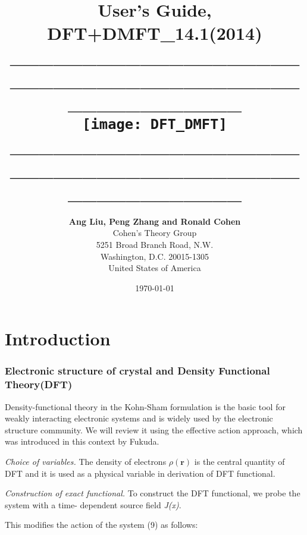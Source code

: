 \documentclass[12 pt]{article}
\title{
      {\Huge\textbf{User's Guide, DFT+DMFT\_14.1(2014)}}
      \_\_\_\_\_\_\_\_\_\_\_\_\_\_\_\_\_\_\_\_\_\_\_\_\_\_\_\_\_\_\_\_\_\_\_\_\_\_\_\_\_\_\_\_\_\_\_\_\_\_\_\_\\
      {\texttt{[image: DFT\_DMFT]}}
      \_\_\_\_\_\_\_\_\_\_\_\_\_\_\_\_\_\_\_\_\_\_\_\_\_\_\_\_\_\_\_\_\_\_\_\_\_\_\_\_\_\_\_\_\_\_\_\_\_\_\_\_\\
      } %
\author{
      \large\textbf{Ang Liu, Peng Zhang and Ronald Cohen}\\
      Cohen's Theory Group\\
      5251 Broad Branch Road, N.W.\\
      Washington, D.C. 20015-1305\\
      United States of America\\
	} %
\date{\today} %
\begin{document}
  \linespread{1.2}
  \maketitle
  \thispagestyle{empty} %
  \newpage %
  \setcounter{page}{1} %
  \renewcommand{\contentsname}{Table of Contents}

  \tableofcontents

  \newpage
  \setcounter{page}{1}	%
  \part{\large\textbf{Introduction}}\label{part:intro}                                        
    \section{\textbf{Electronic structure of crystal and Density Functional Theory(DFT)}}\label{sec:DFT}


  Density-functional theory in the Kohn-Sham formulation is the basic tool for weakly interacting electronic 
systems and is widely used by the electronic structure community. We will review it using the effective action
 approach, which was introduced in this context by Fukuda.

  \emph{Choice of variables.} The density of electrons {$\rho {(\textbf{r})}$} is the central quantity of DFT
 and it is used as a physical variable in derivation of DFT functional.

  \emph{Construction of exact functional.} To construct the DFT functional, we probe the system with a time-
dependent source field \emph{J(x)}.

 This modifies the action of the system (9) as follows:
\end{document}
